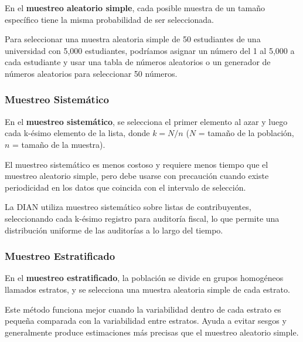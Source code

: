 \begin{definition}
En el \textbf{muestreo aleatorio simple}, cada posible muestra de un tamaño específico tiene la misma probabilidad de ser seleccionada.
\end{definition}

\begin{example}
Para seleccionar una muestra aleatoria simple de 50 estudiantes de una universidad con 5,000 estudiantes, podríamos asignar un número del 1 al 5,000 a cada estudiante y usar una tabla de números aleatorios o un generador de números aleatorios para seleccionar 50 números.
\end{example}

\subsubsection{Muestreo Sistemático}

\begin{definition}
En el \textbf{muestreo sistemático}, se selecciona el primer elemento al azar y luego cada k-ésimo elemento de la lista, donde $k = N/n$ ($N$ = tamaño de la población, $n$ = tamaño de la muestra).
\end{definition}

\begin{remark}
El muestreo sistemático es menos costoso y requiere menos tiempo que el muestreo aleatorio simple, pero debe usarse con precaución cuando existe periodicidad en los datos que coincida con el intervalo de selección.
\end{remark}

\begin{example}
La DIAN utiliza muestreo sistemático sobre listas de contribuyentes, seleccionando cada k-ésimo registro para auditoría fiscal, lo que permite una distribución uniforme de las auditorías a lo largo del tiempo.
\end{example}

\subsubsection{Muestreo Estratificado}

\begin{definition}
En el \textbf{muestreo estratificado}, la población se divide en grupos homogéneos llamados estratos, y se selecciona una muestra aleatoria simple de cada estrato.
\end{definition}

\begin{remark}
Este método funciona mejor cuando la variabilidad dentro de cada estrato es pequeña comparada con la variabilidad entre estratos. Ayuda a evitar sesgos y generalmente produce estimaciones más precisas que el muestreo aleatorio simple.
\end{remark}

